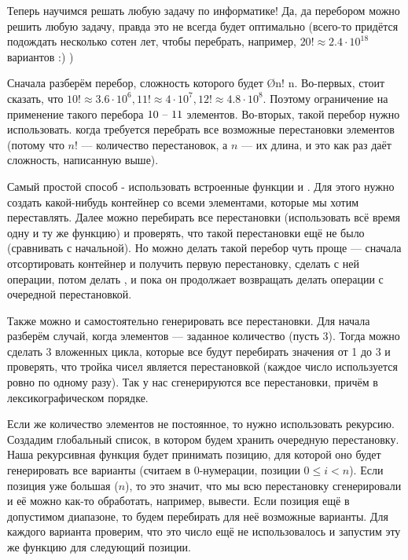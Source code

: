 Теперь научимся решать любую задачу по информатике! Да, да перебором можно решить любую задачу, правда это не всегда будет оптимально (всего-то придётся подождать несколько сотен лет, чтобы перебрать, например, $20! \approx 2.4 \cdot 10^{18}$ вариантов :) )


Сначала разберём перебор, сложность которого будет \O{n! \cdot n}. Во-первых, стоит сказать, что $10! \approx 3.6 \cdot 10^6, 11! \approx 4 \cdot 10^7, 12! \approx 4.8 \cdot 10^8$. Поэтому ограничение на применение такого перебора $10 \text{ -- } 11$ элементов. Во-вторых, такой перебор нужно использовать. когда требуется перебрать все возможные перестановки элементов (потому что $n!$ — количество перестановок, а $n$ — их длина, и это как раз даёт сложность, написанную выше).

Самый простой способ - использовать встроенные функции  и . Для этого нужно создать какой-нибудь контейнер со всеми элементами, которые мы хотим переставлять. Далее можно перебирать все перестановки (использовать всё время одну и ту же функцию) и проверять, что такой перестановки ещё не было (сравнивать с начальной). Но можно делать такой перебор чуть проще — сначала отсортировать контейнер и получить первую перестановку, сделать с ней операции, потом делать , и пока он продолжает возвращать  делать операции с очередной перестановкой.

Также можно и самостоятельно генерировать все перестановки. Для начала разберём случай, когда элементов — заданное количество (пусть 3). Тогда можно сделать 3 вложенных цикла, которые все будут перебирать значения от 1 до 3 и проверять, что тройка чисел является перестановкой (каждое число используется ровно по одному разу). Так у нас сгенерируются все перестановки, причём в лексикографическом порядке. 

Если же количество элементов не постоянное, то нужно использовать рекурсию. Создадим глобальный список, в котором будем хранить очередную перестановку. Наша рекурсивная функция будет принимать позицию, для которой оно будет генерировать все варианты (считаем в 0-нумерации, позиции $0 \leq i < n$). Если позиция уже большая ($n$), то это значит, что мы всю перестановку сгенерировали и её можно как-то обработать, например, вывести. Если позиция ещё в допустимом диапазоне, то будем перебирать для неё возможные варианты. Для каждого варианта проверим, что это число ещё не использовалось и запустим эту же функцию для следующий позиции. 

